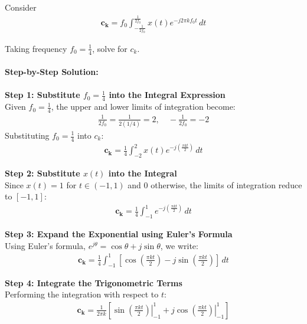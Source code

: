 \documentclass[journal,12pt,onecolumn]{IEEEtran}
\newcommand{\brak}[1]{\left(#1\right)}
\theoremstyle{remark}
\begin{document}
\noindent Consider
\begin{align}
\mathbf{c_k} = f_0 \int_{-\frac{1}{2f_0}}^{\frac{1}{2f_0}} x\brak{t} e^{-j 2\pi k f_0 t} \, dt
\end{align}

\noindent Taking frequency $f_0 = \frac{1}{4}$, solve for $c_k$.\\ \\
\noindent \textbf{Step-by-Step Solution:}\\ \\
\noindent \textbf{Step 1: Substitute $f_0 = \frac{1}{4}$ into the Integral Expression} \\
Given $f_0 = \frac{1}{4}$, the upper and lower limits of integration become:
\begin{align}
\frac{1}{2f_0} = \frac{1}{2\brak{1/4}} = 2, \quad -\frac{1}{2f_0} = -2
\end{align}
Substituting $f_0 = \frac{1}{4}$ into $c_k$:
\begin{align}
\mathbf{c_k} = \frac{1}{4} \int_{-2}^{2} x\brak{t} e^{-j \brak{\frac{\pi k t}{2}}} \, dt
\end{align}

\vspace{0.3cm}
\noindent \textbf{Step 2: Substitute $x\brak{t}$ into the Integral} \\
Since $x\brak{t} = 1$ for $t \in \brak{-1, 1}$ and $0$ otherwise, the limits of integration reduce to $[-1, 1]$:
\begin{align}
\mathbf{c_k} = \frac{1}{4} \int_{-1}^{1} e^{-j \brak{\frac{\pi k t}{2}}} \, dt
\end{align}

\vspace{0.3cm}
\noindent \textbf{Step 3: Expand the Exponential using Euler's Formula} \\
Using Euler's formula, $e^{j\theta} = \cos\theta + j\sin\theta$, we write:
\begin{align}
\mathbf{c_k} = \frac{1}{4} \int_{-1}^{1} \left[ \cos\brak{\frac{\pi k t}{2}} - j \sin\brak{\frac{\pi k t}{2}} \right] \, dt
\end{align}

\vspace{0.3cm}
\noindent \textbf{Step 4: Integrate the Trigonometric Terms} \\
Performing the integration with respect to $t$:
\begin{align}
\mathbf{c_k} = \frac{1}{2\pi k} \left[ \left. \sin\brak{\frac{\pi k t}{2}} \right|_{-1}^{1} + \left. j \cos\brak{\frac{\pi k t}{2}} \right|_{-1}^{1} \right]
\end{align}
\end{document}
